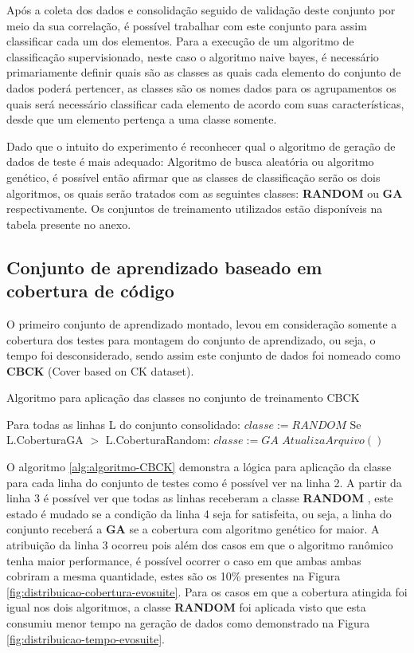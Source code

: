 \documentclass[
	12pt,				%
	oneside,			%
	a4paper,			%
	english,			%
	brazil				%
	]{abntex2ppgsi}
\begin{document}
Após a coleta dos dados e consolidação seguido de validação deste conjunto por meio da sua correlação, é possível trabalhar com este conjunto para assim classificar cada um dos elementos. Para a execução de um algoritmo de classificação supervisionado, neste caso o algoritmo naive bayes, é necessário primariamente definir quais são as classes as quais cada elemento do conjunto de dados poderá pertencer, as classes são os nomes dados para os agrupamentos os quais será necessário classificar cada elemento de acordo com suas características, desde que um elemento pertença a uma classe somente.

Dado que o intuito do experimento é reconhecer qual o algoritmo de geração de dados de teste é mais adequado: Algoritmo de busca aleatória ou algoritmo genético, é possível então afirmar que as classes de classificação serão os dois algoritmos, os quais serão tratados com as seguintes classes:  \textbf{RANDOM} ou \textbf{GA} respectivamente.  Os conjuntos de treinamento utilizados estão disponíveis na tabela presente no anexo.

\subsection{Conjunto de aprendizado baseado em cobertura de código}

O primeiro conjunto de aprendizado montado, levou em consideração somente a cobertura dos testes para montagem do conjunto de aprendizado, ou seja, o tempo foi desconsiderado, sendo assim este conjunto de dados foi nomeado como \textbf{CBCK} (Cover based on CK dataset).

\begin{algorithm}[htbp]
\caption{Algoritmo para aplicação das classes no conjunto de treinamento CBCK}
\label{alg:algoritmo-CBCK}
\begin{algorithmic}[1]

\State Para todas as linhas L do conjunto consolidado:
\State $classe := RANDOM$
\State 		Se L.CoberturaGA $>$ L.CoberturaRandom: $classe := GA$
\State $AtualizaArquivo()$
\EndProcedure
\end{algorithmic}
\end{algorithm}

O algoritmo \ref{alg:algoritmo-CBCK} demonstra a lógica para aplicação da classe para cada linha do conjunto de testes como é possível ver na linha 2. A partir da linha 3 é possível ver que todas as linhas receberam a classe \textbf{RANDOM} , este estado é mudado se a condição da linha 4 seja for satisfeita, ou seja, a linha do conjunto receberá a  \textbf{GA} se a cobertura com algoritmo genético for maior. A atribuição da linha 3 ocorreu pois além dos casos em que o algoritmo ranômico tenha maior performance, é possível ocorrer o caso em que ambas ambas cobriram a mesma quantidade, estes são os 10\% presentes na Figura \ref{fig:distribuicao-cobertura-evosuite}. Para os casos em que a cobertura atingida foi igual nos dois algoritmos, a classe  \textbf{RANDOM}  foi aplicada visto que esta consumiu menor tempo na geração de dados como demonstrado na Figura \ref{fig:distribuicao-tempo-evosuite}.
\end{document}
